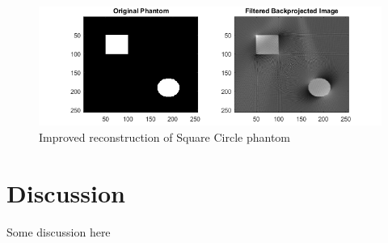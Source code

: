 \documentclass[journal]{IEEEtran}
\begin{document}
\begin{figure}[h]
	\centering
	\includegraphics[width=\columnwidth,height=.15\textheight]{images/sqcircimproved.png}
	\caption{Improved reconstruction of Square Circle phantom}\label{fig:sqcircimproved}
\end{figure}




\section{Discussion} \label{sec:discuss}
Some discussion here



\printbibliography
\end{document}

